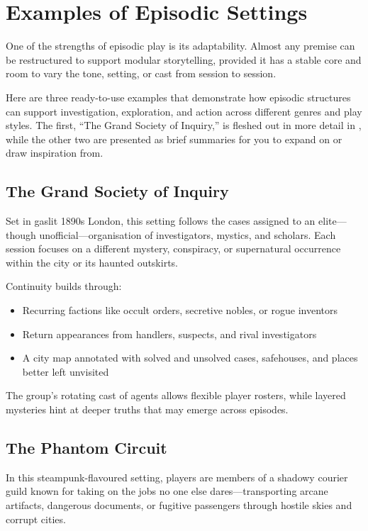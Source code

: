 \section{Examples of Episodic Settings}

One of the strengths of episodic play is its adaptability. Almost any premise can be restructured to support modular storytelling, provided it has a stable core and room to vary the tone, setting, or cast from session to session.

Here are three ready-to-use examples that demonstrate how episodic structures can support investigation, exploration, and action across different genres and play styles. The first, “The Grand Society of Inquiry,” is fleshed out in more detail in , while the other two are presented as brief summaries for you to expand on or draw inspiration from.

\subsection*{The Grand Society of Inquiry}

Set in gaslit 1890s London, this setting follows the cases assigned to an elite—though unofficial—organisation of investigators, mystics, and scholars. Each session focuses on a different mystery, conspiracy, or supernatural occurrence within the city or its haunted outskirts.

Continuity builds through:
\begin{itemize}
    \item Recurring factions like occult orders, secretive nobles, or rogue inventors
    \item Return appearances from handlers, suspects, and rival investigators
    \item A city map annotated with solved and unsolved cases, safehouses, and places better left unvisited
\end{itemize}

The group’s rotating cast of agents allows flexible player rosters, while layered mysteries hint at deeper truths that may emerge across episodes.

\subsection*{The Phantom Circuit}

In this steampunk-flavoured setting, players are members of a shadowy courier guild known for taking on the jobs no one else dares—transporting arcane artifacts, dangerous documents, or fugitive passengers through hostile skies and corrupt cities.


